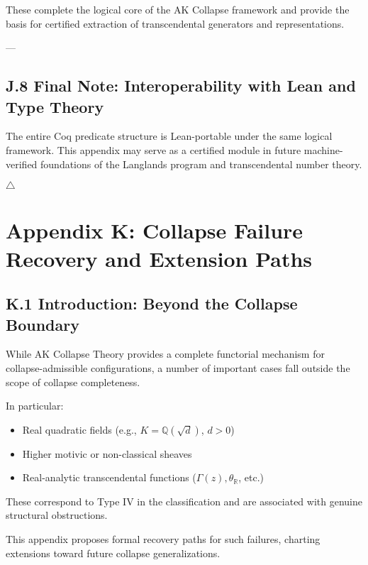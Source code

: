 \documentclass[11pt]{article}
\begin{document}
These complete the logical core of the AK Collapse framework and provide the basis for certified extraction of transcendental generators and representations.

---

\subsection*{J.8 Final Note: Interoperability with Lean and Type Theory}

The entire Coq predicate structure is Lean-portable under the same logical framework.  
This appendix may serve as a certified module in future machine-verified foundations of the Langlands program and transcendental number theory.

\hfill $\triangle$



\appendix
\section*{Appendix K: Collapse Failure Recovery and Extension Paths}

\subsection*{K.1 Introduction: Beyond the Collapse Boundary}

While AK Collapse Theory provides a complete functorial mechanism for collapse-admissible configurations, a number of important cases fall outside the scope of collapse completeness.

In particular:

\begin{itemize}
  \item Real quadratic fields (e.g., \( K = \mathbb{Q}(\sqrt{d}) \), \( d > 0 \))
  \item Higher motivic or non-classical sheaves
  \item Real-analytic transcendental functions (\( \Gamma(z), \theta_{\mathbb{R}} \), etc.)
\end{itemize}

These correspond to Type IV in the classification and are associated with genuine structural obstructions.

This appendix proposes formal recovery paths for such failures, charting extensions toward future collapse generalizations.
\end{document}
